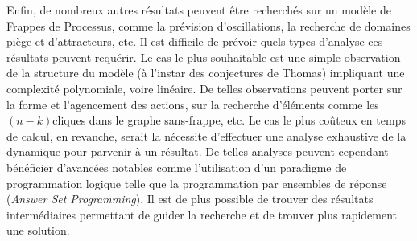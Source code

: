 Enfin, de nombreux autres résultats peuvent être recherchés sur un modèle de Frappes
de Processus, comme la prévision d'oscillations, la recherche
de domaines piège et d'attracteurs, etc.
Il est difficile de prévoir quels types d'analyse ces résultats peuvent requérir.
Le cas le plus souhaitable est une simple observation de la structure du modèle
(à l'instar des conjectures de Thomas) impliquant une complexité polynomiale, voire linéaire.
De telles observations peuvent porter sur la forme et l'agencement des actions,
sur la recherche d'éléments comme les $(n-k)$\nbd cliques dans le graphe sans-frappe,
etc.
Le cas le plus coûteux en temps de calcul, en revanche, serait la nécessite d'effectuer
une analyse exhaustive de la dynamique pour parvenir à un résultat.
De telles analyses peuvent cependant bénéficier d'avancées notables
comme l'utilisation d'un paradigme de programmation logique
telle que la programmation par ensembles de réponse (\textit{Answer Set Programming}).
Il est de plus possible de trouver des résultats intermédiaires
permettant de guider la recherche et de trouver plus rapidement une solution.



%   
% 
